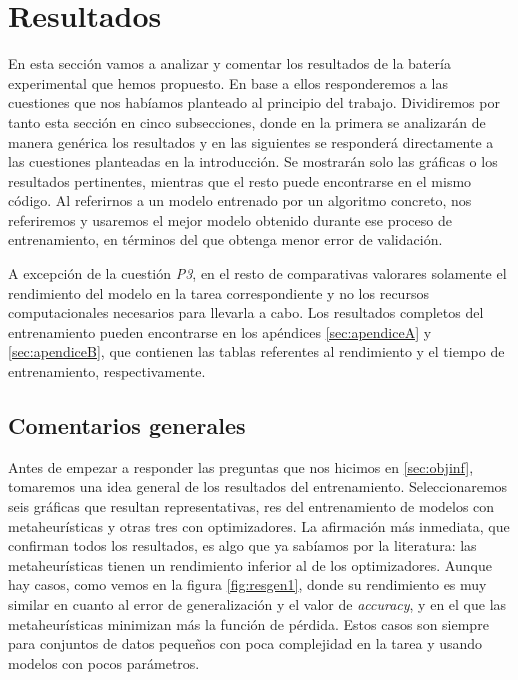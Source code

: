 \section{Resultados}

En esta sección vamos a analizar y comentar los resultados de la batería experimental que hemos propuesto. En base a ellos responderemos a las cuestiones que nos habíamos planteado al principio del trabajo. Dividiremos por tanto esta sección en cinco subsecciones, donde en la primera se analizarán de manera genérica los resultados y en las siguientes se responderá directamente a las cuestiones planteadas en la introducción. Se mostrarán solo las gráficas o los resultados pertinentes, mientras que el resto puede encontrarse en el mismo código. Al referirnos a un modelo entrenado por un algoritmo concreto, nos referiremos y usaremos el mejor modelo obtenido durante ese proceso de entrenamiento, en términos del que obtenga menor error de validación. 

A excepción de la cuestión \textit{P3}, en el resto de comparativas valorares solamente el rendimiento del modelo en la tarea correspondiente y no los recursos computacionales necesarios para llevarla a cabo. Los resultados completos del entrenamiento pueden encontrarse en los apéndices \ref{sec:apendiceA} y \ref{sec:apendiceB}, que contienen las tablas referentes al rendimiento y el tiempo de entrenamiento, respectivamente.

\subsection{Comentarios generales}

Antes de empezar a responder las preguntas que nos hicimos en \ref{sec:objinf}, tomaremos una idea general de los resultados del entrenamiento. Seleccionaremos seis gráficas que resultan representativas, res del entrenamiento de modelos con metaheurísticas y otras tres con optimizadores. La afirmación más inmediata, que confirman todos los resultados, es algo que ya sabíamos por la literatura: las metaheurísticas tienen un rendimiento inferior al de los optimizadores. Aunque hay casos, como vemos en la figura \ref{fig:resgen1}, donde su rendimiento es muy similar en cuanto al error de generalización y el valor de \textit{accuracy}, y en el que las metaheurísticas minimizan más la función de pérdida. Estos casos son siempre para conjuntos de datos pequeños con poca complejidad en la tarea y usando modelos con pocos parámetros. 

